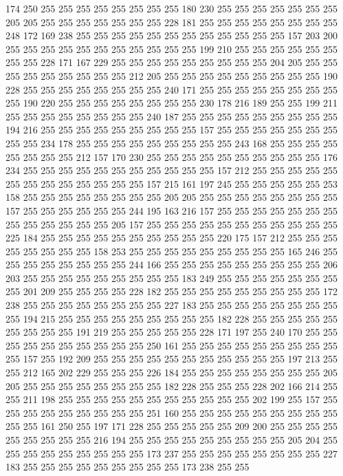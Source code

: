 174 250 255 255 255 255 255 255 255 255 180 230 255 255 255 255 255 255 255 205
205 255 255 255 255 255 255 255 228 181 255 255 255 255 255 255 255 255 248 172
169 238 255 255 255 255 255 255 255 255 255 255 255 255 157 203 200 255 255 255
255 255 255 255 255 255 255 255 199 210 255 255 255 255 255 255 255 255 228 171
167 229 255 255 255 255 255 255 255 255 255 204 205 255 255 255 255 255 255 255
255 255 212 205 255 255 255 255 255 255 255 255 255 190 228 255 255 255 255 255
255 255 255 240 171 255 255 255 255 255 255 255 255 255 190 220 255 255 255 255
255 255 255 255 230 178 216 189 255 255 199 211 255 255 255 255 255 255 255 255
240 187 255 255 255 255 255 255 255 255 255 194 216 255 255 255 255 255 255 255
255 255 157 255 255 255 255 255 255 255 255 255 234 178 255 255 255 255 255 255
255 255 255 243 168 255 255 255 255 255 255 255 255 212 157 170 230 255 255 255
255 255 255 255 255 255 255 176 234 255 255 255 255 255 255 255 255 255 255 255
157 212 255 255 255 255 255 255 255 255 255 255 255 255 255 157 215 161 197 245
255 255 255 255 255 253 158 255 255 255 255 255 255 255 255 205 205 255 255 255
255 255 255 255 255 157 255 255 255 255 255 255 244 195 163 216 157 255 255 255
255 255 255 255 255 255 255 255 255 255 205 157 255 255 255 255 255 255 255 255
255 255 255 225 184 255 255 255 255 255 255 255 255 255 255 220 175 157 212 255
255 255 255 255 255 255 255 158 253 255 255 255 255 255 255 255 255 255 165 246
255 255 255 255 255 255 255 255 244 166 255 255 255 255 255 255 255 255 255 206
203 255 255 255 255 255 255 255 255 255 183 249 255 255 255 255 255 255 255 255
201 209 255 255 255 255 228 182 255 255 255 255 255 255 255 255 255 172 238 255
255 255 255 255 255 255 255 227 183 255 255 255 255 255 255 255 255 255 194 215
255 255 255 255 255 255 255 255 255 182 228 255 255 255 255 255 255 255 255 255
191 219 255 255 255 255 255 228 171 197 255 240 170 255 255 255 255 255 255 255
255 255 255 250 161 255 255 255 255 255 255 255 255 255 255 157 255 192 209 255
255 255 255 255 255 255 255 255 255 255 197 213 255 255 212 165 202 229 255 255
255 226 184 255 255 255 255 255 255 255 255 205 205 255 255 255 255 255 255 255
255 182 228 255 255 255 228 202 166 214 255 255 211 198 255 255 255 255 255 255
255 255 255 255 255 202 199 255 157 255 255 255 255 255 255 255 255 255 251 160
255 255 255 255 255 255 255 255 255 255 255 161 250 255 197 171 228 255 255 255
255 255 209 200 255 255 255 255 255 255 255 255 255 216 194 255 255 255 255 255
255 255 255 255 205 204 255 255 255 255 255 255 255 255 255 173 237 255 255 255
255 255 255 255 255 227 183 255 255 255 255 255 255 255 255 255 173 238 255 255
